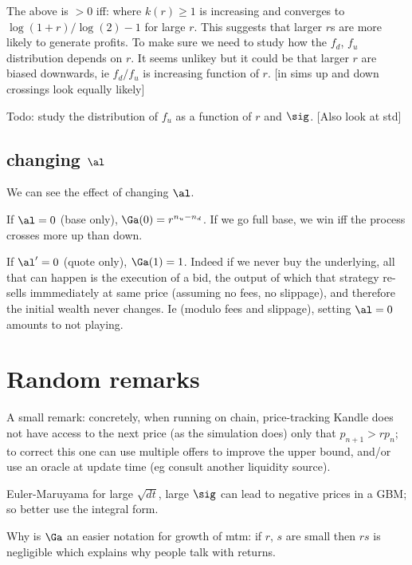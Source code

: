 \documentclass[oneside,twocolumn,12pt]{article}
\begin{document}
The above is $>0$ iff:
where $k(r)\geq 1$ is increasing and converges to $\log(1+r)/\log(2) -1$ for large $r$.
This suggests that  larger $r$s are more likely to generate profits. To make sure we need
to study how the $f_d$, $f_u$ distribution depends on $r$. It seems unlikey but it could be that larger $r$ are biased 
downwards, ie $f_d/f_u$ is increasing function of $r$. [in sims up and down crossings 
look equally likely]

Todo: study the distribution of $f_u$ as a function of $r$ and $\sig$. [Also look at std]

\subsection{changing $\al$}
We can see the effect of changing $\al$.

If $\al=0$ (base only), $\Ga(0) = r^{n_u-n_d}$. If we go full base,
we win iff the process crosses more up than down.

If $\al'=0$ (quote only), $\Ga(1) = 1$. Indeed if we never buy the underlying,
all that can happen is the execution of a bid, 
the output of which that strategy re-sells immmediately at same price (assuming no fees, no slippage),
and therefore the initial wealth never changes. Ie (modulo fees and slippage), setting $\al=0$ amounts to not playing.


\section{Random remarks}

A small remark: concretely, when running on chain, price-tracking Kandle does not have access to the next price (as the simulation does)
only that $p_{n+1}>r p_n$;
to correct this one can use multiple offers to improve the upper bound,
and/or use an oracle at update time (eg consult another liquidity source).

Euler-Maruyama for large $\sqrt{dt}$, large $\sig$ can lead to negative prices in a GBM;
so better use the integral form. 


Why is $\Ga$ an easier notation for growth of mtm:
if $r$, $s$ are small then $rs$ is negligible which explains why people talk with returns.
\end{document}
